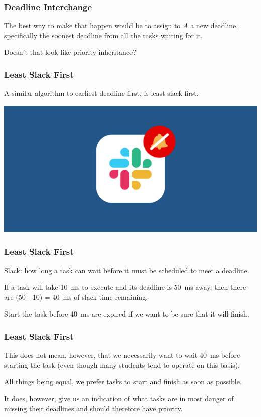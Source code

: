 \begin{frame}
\frametitle{Deadline Interchange}

The best way to make that happen would be to assign to $A$ a new deadline, specifically the soonest deadline from all the tasks waiting for it. 

Doesn't that look like priority inheritance?

\end{frame}


\begin{frame}
\frametitle{Least Slack First}

A similar algorithm to earliest deadline first, is least slack first.

\begin{center}
	\includegraphics[width=\textwidth]{images/slack.png}
\end{center}


\end{frame}

\begin{frame}
\frametitle{Least Slack First}

\alert{Slack}: how long a task can wait before it must be scheduled to meet a deadline.

If a task will take 10~ms to execute and its deadline is 50~ms away, then there are (50 - 10) = 40~ms of slack time remaining.

Start the task before 40~ms are expired if we want to be sure that it will finish. 

\end{frame}

\begin{frame}
\frametitle{Least Slack First}
This does not mean, however, that we necessarily want to wait 40~ms before starting the task (even though many students tend to operate on this basis). 

All things being equal, we prefer tasks to start and finish as soon as possible. 

It does, however, give us an indication of what tasks are in most danger of missing their deadlines and should therefore have priority.

\end{frame}

